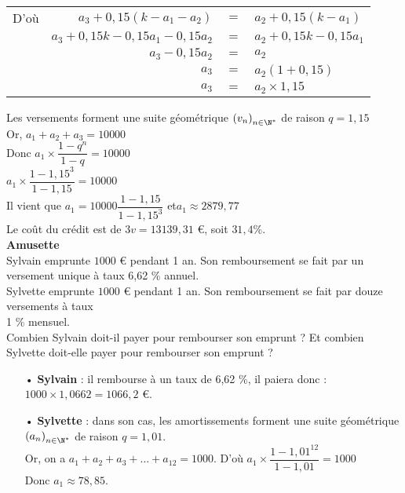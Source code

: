 \begin{tabular}{lrll}
D'où & $a_3 + 0,15\left(k - a_1 - a_2\right)$ & $=$ & $a_2 + 0,15\left(k-a_1\right)$ \\
& $a_3 + 0,15k - 0,15a_1 - 0,15a_2$ & $ = $ & $ a_2 + 0,15k - 0,15a_1$ \\
& $a_3 - 0,15a_2$ & $ = $ & $ a_2$ \\
& $a_3$ & $=$ & $a_2 \left(1 + 0,15\right)$ \\
& $a_3$ & $=$ & $a_2 \times 1,15$ \\
\end{tabular}

\vspace*{.3cm}

Les versements forment une suite géométrique $\left(v_n\right)_{n \in \N^*}$ de raison $q = 1,15$ \\

Or, $a_1 + a_2 + a_3 = 10 000$ \\

Donc $a_1 \times \dfrac{1-q^n}{1-q} = 10000$\\

$a_1 \times \dfrac{1-1,15^3}{1 - 1,15} = 10 000$ \\

Il vient que $a_1 = 10 000 \dfrac{1-1,15}{1-1,15^3}$ et$a_1 \approx 2879,77$ \\

Le coût du crédit est de $3v = 13 139,31$ €, soit $31,4$\%. \\

\textbf{Amusette} \\

Sylvain emprunte $1000$ € pendant 1 an. Son remboursement se fait par un versement unique à taux 6,62 \% annuel. \\

Sylvette emprunte $1 000$ € pendant 1 an. Son remboursement se fait par douze versements à taux \\ 1 \% mensuel. \\

Combien Sylvain doit-il payer pour rembourser son emprunt ? Et combien Sylvette doit-elle payer pour rembourser son emprunt ? \\ 

\begin{itemize}
\item[•] \textbf{Sylvain} : il rembourse à un taux de 6,62 \%, il paiera donc : $1000 \times 1,0662 = 1066,2$ €. \\
\item[•] \textbf{Sylvette} : dans son cas, les amortissements forment une suite géométrique $\left(a_n\right)_{n\in \N^*}$ de raison $q = 1,01$. \\

Or, on a $a_1 + a_2 + a_3 + ... + a_{12} = 1000$. D'où $a_1 \times \dfrac{1-1,01^{12}}{1-1,01} = 1000$ \\

Donc $a_1 \approx 78,85$.

\end{itemize}

